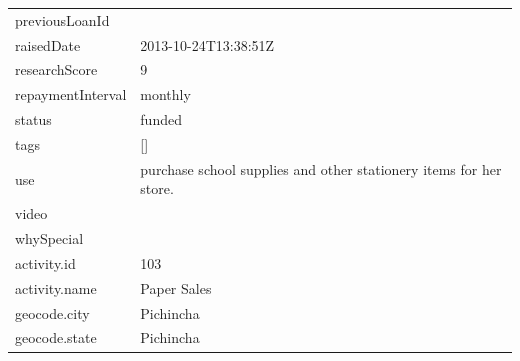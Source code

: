\begin{longtable}{|p{}|p{}|}
	previousLoanId                                  &                                                                                                               \\
	raisedDate                                      & 2013-10-24T13:38:51Z                                                                                          \\
	researchScore                                   & 9                                                                                                             \\
	repaymentInterval                               & monthly                                                                                                       \\
	status                                          & funded                                                                                                        \\
	tags                                            & {[}{]}                                                                                                        \\
	use                                             & purchase school supplies and other stationery items for her
	store.                                                                                                                                                          \\
	video                                           &                                                                                                               \\
	whySpecial                                      &                                                                                                               \\
	activity.id                                     & 103                                                                                                           \\
	activity.name                                   & Paper Sales                                                                                                   \\
	geocode.city                                    & Pichincha                                                                                                     \\
	geocode.state                                   & Pichincha                                                                                                     \\

\end{longtable}
